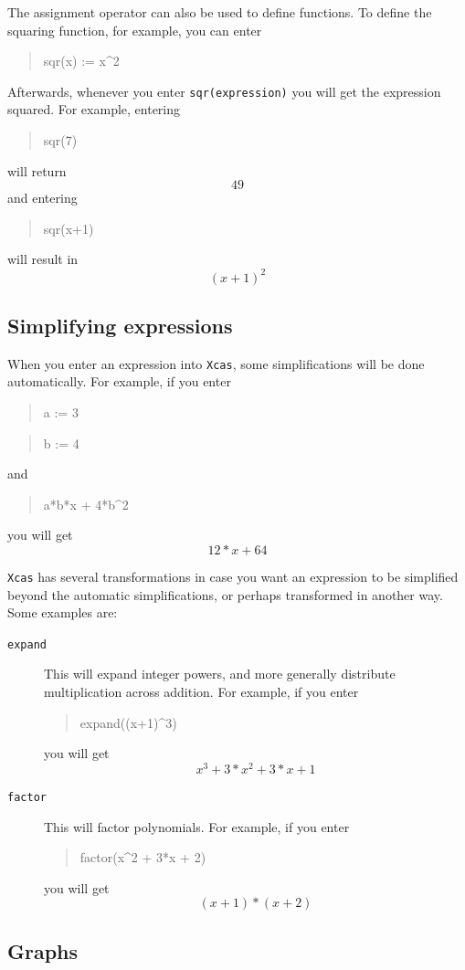 \documentclass{article}
\newcommand{\xcasin}[1]
{\begin{quote}\ttfamily
#1
\end{quote}}
\newcommand{\xcasout}[1]
{\begin{equation*}
#1
\end{equation*}}
\begin{document}
The assignment operator can also be used to define 
functions.  To
define the squaring function, for example, you can enter
\xcasin{sqr(x) := x\^{}2}
Afterwards, whenever you enter \texttt{sqr(expression)} you will
get the expression squared.  For example, entering
\xcasin{sqr(7)}
will return
\xcasout{49}
and entering
\xcasin{sqr(x+1)}
will result in
\xcasout{(x+1)^2}

\subsection{Simplifying expressions}

When you enter an expression into \texttt{Xcas}, some simplifications
will be done automatically.  For example, if you enter
\xcasin{a := 3}
\xcasin{b := 4}
and
\xcasin{a*b*x + 4*b\^{}2}
you will get
\xcasout{12*x + 64}

\texttt{Xcas} has several transformations in case you want an
expression to be simplified beyond the automatic simplifications, or
perhaps transformed in another way.  Some examples are:
\begin{description}
  \item[\texttt{expand}]
  This will expand integer powers, and more generally distribute
  multiplication across addition.  For example, if you enter
  \xcasin{expand((x+1)\^{}3)}
  you will get
  \xcasout{x^3 + 3*x^2 + 3*x + 1}
  
  \item[\texttt{factor}]
  This will factor polynomials.  For example, if you enter
  \xcasin{factor(x\^{}2 + 3*x + 2)}
  you will get
  \xcasout{(x + 1)*(x + 2)}
\end{description}  

\subsection{Graphs}
\end{document}

